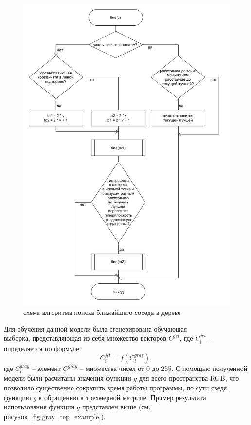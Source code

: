 \documentclass[14pt, a4paper]{extreport}
\begin{document}
	\begin{figure}[h!]
		\centering
		\includegraphics[width = 15cm]{image/chapter_2/kdtreealgo}	
		\caption{схема алгоритма поиска ближайшего соседа в дереве}
		\label{fig:kdtreealgo}
	\end{figure}
	
	Для обучения данной модели была сгенерирована обучающая \\ выборка, представляющая из себя множество векторов $C^{jet}$, где $C^{jet}_{i}$ -- определяется по формуле:
	\begin{equation}
		C^{jet}_{i} = f(C^{gray}_{i}),
		\label{eq:Cjetgray}
	\end{equation}
	где $C^{gray}_{i}$ -- элемент $C^{gray}$ -- множества чисел от 0 до 255. С помощью полученной модели были расчитаны значения функции $g$ для всего пространства RGB, что позволило существенно сократить время работы программы, по сути сведя функцию $g$ к обращению к трехмерной матрице. Пример результата использования функции $g$ представлен выше (см. рисунок~\ref{fig:gray_tep_example}).
	
\end{document}
